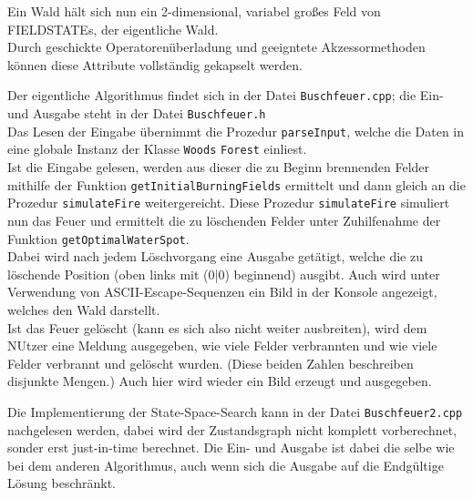 Ein Wald hält sich nun ein 2-dimensional, variabel großes Feld von FIELDSTATEs, der eigentliche Wald.\\
Durch geschickte Operatorenüberladung und geeigntete Akzessormethoden können diese Attribute vollständig gekapselt werden.

Der eigentliche Algorithmus findet sich in der Datei \texttt{Buschfeuer.cpp}; die Ein- und Ausgabe steht in der Datei \texttt{Buschfeuer.h}\\
Das Lesen der Eingabe übernimmt die Prozedur \texttt{parseInput}, welche die Daten in eine globale Instanz der Klasse \texttt{Woods} \texttt{Forest} einliest.\\
Ist die Eingabe gelesen, werden aus dieser die zu Beginn brennenden Felder mithilfe der Funktion \texttt{getInitialBurningFields} ermittelt und dann gleich an die Prozedur \texttt{simulateFire} weitergereicht. Diese Prozedur \texttt{simulateFire} simuliert nun das Feuer und ermittelt die zu löschenden Felder unter Zuhilfenahme der Funktion \texttt{getOptimalWaterSpot}.\\
Dabei wird nach jedem Löschvorgang eine Ausgabe getätigt, welche die zu löschende Position (oben links mit (0|0) beginnend) ausgibt. Auch wird unter Verwendung von ASCII-Escape-Sequenzen ein Bild in der Konsole angezeigt, welches den Wald darstellt.\\
Ist das Feuer gelöscht (kann es sich also nicht weiter ausbreiten), wird dem NUtzer eine Meldung ausgegeben, wie viele Felder verbrannten und wie viele Felder verbrannt und gelöscht wurden. (Diese beiden Zahlen beschreiben disjunkte Mengen.) Auch hier wird wieder ein Bild erzeugt und ausgegeben.


Die Implementierung der State-Space-Search kann in der Datei \texttt{Buschfeuer2.cpp} nachgelesen werden, dabei wird der Zustandsgraph nicht komplett vorberechnet, sonder erst just-in-time berechnet. Die Ein- und Ausgabe ist dabei die selbe wie bei dem anderen Algorithmus, auch wenn sich die Ausgabe auf die Endgültige Lösung beschränkt.

